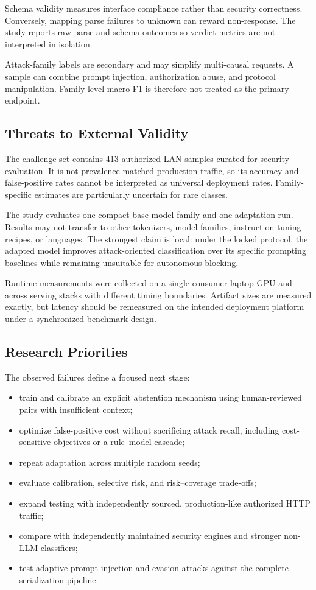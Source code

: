 Schema validity measures interface compliance rather than security correctness. Conversely, mapping parse failures to unknown can reward non-response. The study reports raw parse and schema outcomes so verdict metrics are not interpreted in isolation.

Attack-family labels are secondary and may simplify multi-causal requests. A sample can combine prompt injection, authorization abuse, and protocol manipulation. Family-level macro-F1 is therefore not treated as the primary endpoint.

\subsection{Threats to External Validity}
The challenge set contains 413 authorized LAN samples curated for security evaluation. It is not prevalence-matched production traffic, so its accuracy and false-positive rates cannot be interpreted as universal deployment rates. Family-specific estimates are particularly uncertain for rare classes.

The study evaluates one compact base-model family and one adaptation run. Results may not transfer to other tokenizers, model families, instruction-tuning recipes, or languages. The strongest claim is local: under the locked protocol, the adapted model improves attack-oriented classification over its specific prompting baselines while remaining unsuitable for autonomous blocking.

Runtime measurements were collected on a single consumer-laptop GPU and across serving stacks with different timing boundaries. Artifact sizes are measured exactly, but latency should be remeasured on the intended deployment platform under a synchronized benchmark design.

\subsection{Research Priorities}
The observed failures define a focused next stage:
\begin{itemize}
    \item train and calibrate an explicit abstention mechanism using human-reviewed pairs with insufficient context;
    \item optimize false-positive cost without sacrificing attack recall, including cost-sensitive objectives or a rule--model cascade;
    \item repeat adaptation across multiple random seeds;
    \item evaluate calibration, selective risk, and risk--coverage trade-offs;
    \item expand testing with independently sourced, production-like authorized HTTP traffic;
    \item compare with independently maintained security engines and stronger non-LLM classifiers;
    \item test adaptive prompt-injection and evasion attacks against the complete serialization pipeline.
\end{itemize}
